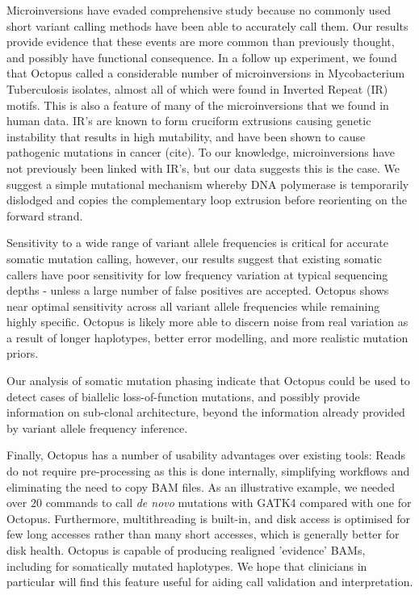 \documentclass[notitlepage, twocolumn]{article}
\begin{document}
Microinversions have evaded comprehensive study because no commonly used short variant calling methods have been able to accurately call them. Our results provide evidence that these events are more common than previously thought, and possibly have functional consequence. In a follow up experiment, we found that Octopus called a considerable number of microinversions in Mycobacterium Tuberculosis isolates, almost all of which were found in Inverted Repeat (IR) motifs. This is also a feature of many of the microinversions that we found in human data. IR's are known to form cruciform extrusions causing genetic instability that results in high mutability, and have been shown to cause pathogenic mutations in cancer (cite). To our knowledge, microinversions have not previously been linked with IR's, but our data suggests this is the case. We suggest a simple mutational mechanism whereby DNA polymerase is temporarily dislodged and copies the complementary loop extrusion before reorienting on the forward strand.

Sensitivity to a wide range of variant allele frequencies is critical for accurate somatic mutation calling, however, our results suggest that existing somatic callers have poor sensitivity for low frequency variation at typical sequencing depths - unless a large number of false positives are accepted. Octopus shows near optimal sensitivity across all variant allele frequencies while remaining highly specific. Octopus is likely more able to discern noise from real variation as a result of longer haplotypes, better error modelling, and more realistic mutation priors.

Our analysis of somatic mutation phasing indicate that Octopus could be used to detect cases of biallelic loss-of-function mutations, and possibly provide information on sub-clonal architecture, beyond the information already provided by variant allele frequency inference. 

Finally, Octopus has a number of usability advantages over existing tools: Reads do not require pre-processing as this is done internally, simplifying workflows and eliminating the need to copy BAM files. As an illustrative example, we needed over $20$ commands to call \textit{de novo} mutations with GATK4 compared with one for Octopus. Furthermore, multithreading is built-in, and disk access is optimised for few long accesses rather than many short accesses, which is generally better for disk health. Octopus is capable of producing realigned 'evidence' BAMs, including for somatically mutated haplotypes. We hope that clinicians in particular will find this feature useful for aiding call validation and interpretation.
\end{document}
